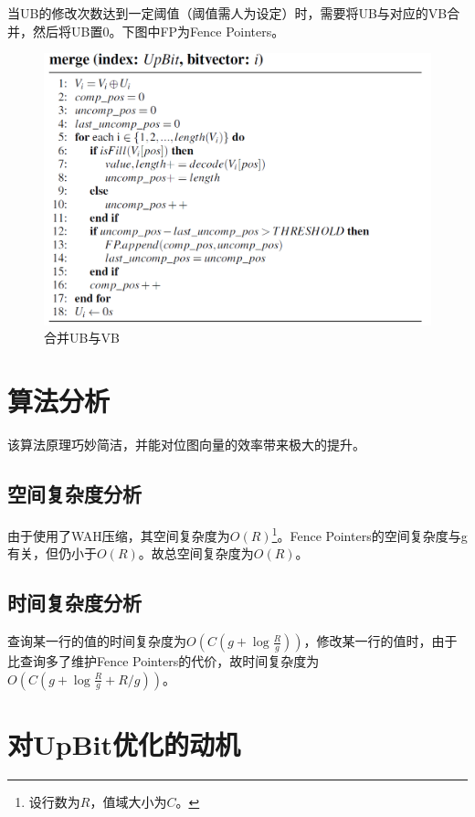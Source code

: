\documentclass[11pt, a4paper]{article}
\begin{document}
  当UB的修改次数达到一定阈值（阈值需人为设定）时，需要将UB与对应的VB合并，然后将UB置0。下图中FP为Fence Pointers。

  \begin{figure}[H]
    \begin{center}
      \includegraphics[width=5in]{img/merge.png}
      \caption{合并UB与VB}
      \label{fig:merge}
    \end{center}
  \end{figure}

  \section{算法分析}

  该算法原理巧妙简洁，并能对位图向量的效率带来极大的提升。

  \subsection{空间复杂度分析}

  由于使用了WAH压缩，其空间复杂度为$O(R)$\footnote{设行数为$R$，值域大小为$C$。}。Fence Pointers的空间复杂度与g有关，但仍小于$O(R)$。故总空间复杂度为$O(R)$。

  \subsection{时间复杂度分析}

  查询某一行的值的时间复杂度为$O(C(g + \log \frac{R}{g}))$，修改某一行的值时，由于比查询多了维护Fence Pointers的代价，故时间复杂度为$O(C(g + \log \frac{R}{g} + R/g))$。


\section{对UpBit优化的动机}
\end{document}
